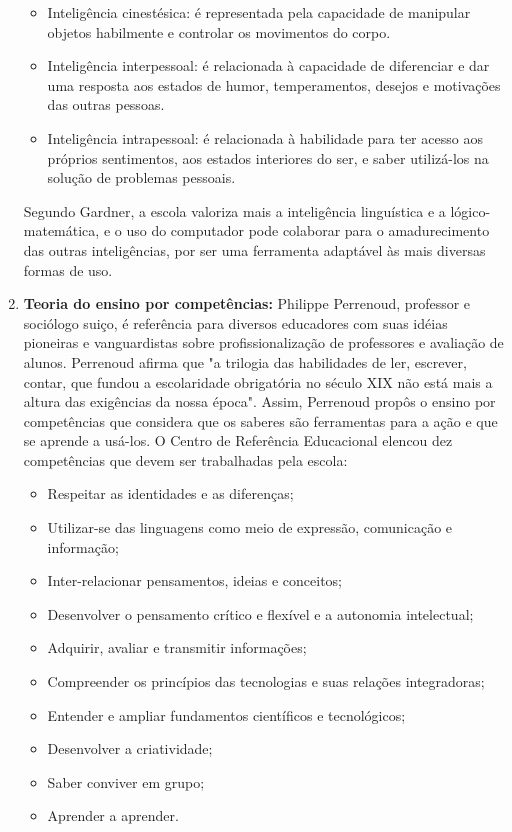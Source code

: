 \begin{enumerate}
\begin{itemize}
\item Inteligência cinestésica: é representada pela capacidade de manipular objetos habilmente e controlar os movimentos do corpo.
\item Inteligência interpessoal: é relacionada à capacidade de diferenciar e dar uma resposta aos estados de humor, temperamentos, desejos e motivações das outras pessoas.
\item Inteligência intrapessoal: é relacionada à habilidade para ter acesso aos próprios sentimentos, aos estados interiores do ser, e saber utilizá-los na solução de problemas pessoais. 
\end{itemize}
Segundo Gardner, a escola valoriza mais a inteligência linguística e a lógico-matemática, e o uso do computador pode colaborar para o amadurecimento das outras inteligências, por ser uma ferramenta adaptável às mais diversas formas de uso.

\item \textbf{Teoria do ensino por competências:} Philippe Perrenoud, professor e sociólogo suiço, é referência para diversos educadores com suas idéias pioneiras e vanguardistas sobre profissionalização de professores e avaliação de alunos. Perrenoud afirma que "a trilogia das habilidades de ler, escrever, contar, que fundou a escolaridade obrigatória no século XIX não está mais a altura das exigências da nossa época". Assim, Perrenoud propôs o ensino por competências que considera que os saberes são ferramentas para a ação e que se aprende a usá-los. O Centro de Referência Educacional elencou dez competências que devem ser trabalhadas pela escola: 
\begin{itemize}
\item Respeitar as identidades e as diferenças;
\item Utilizar-se das linguagens como meio de expressão, comunicação e informação;
\item Inter-relacionar pensamentos, ideias e conceitos;
\item Desenvolver o pensamento crítico e flexível e a autonomia intelectual;
\item Adquirir, avaliar e transmitir informações;
\item Compreender os princípios das tecnologias e suas relações integradoras;
\item Entender e ampliar fundamentos científicos e tecnológicos;
\item Desenvolver a criatividade; 
\item Saber conviver em grupo; 
\item Aprender a aprender.
\end{itemize} 


\end{enumerate}
